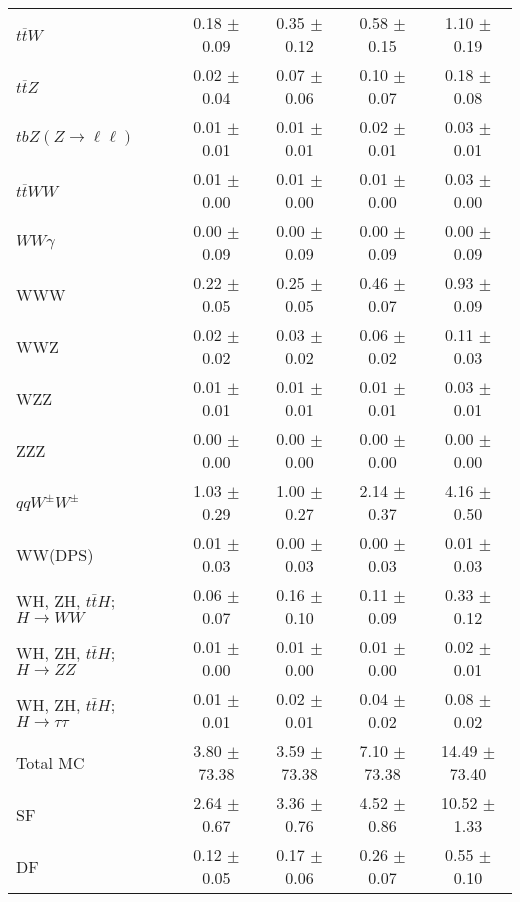 \begin{tabular}{l|cccc}
                   $t\overline{t}W$ &  0.18 $\pm$  0.09 &  0.35 $\pm$  0.12 &  0.58 $\pm$  0.15 &  1.10 $\pm$  0.19 \\
                   $t\overline{t}Z$ &  0.02 $\pm$  0.04 &  0.07 $\pm$  0.06 &  0.10 $\pm$  0.07 &  0.18 $\pm$  0.08 \\
    $tbZ (Z \rightarrow \ell \ell)$ &  0.01 $\pm$  0.01 &  0.01 $\pm$  0.01 &  0.02 $\pm$  0.01 &  0.03 $\pm$  0.01 \\
                  $t\overline{t}WW$ &  0.01 $\pm$  0.00 &  0.01 $\pm$  0.00 &  0.01 $\pm$  0.00 &  0.03 $\pm$  0.00 \\
                         $WW\gamma$ &  0.00 $\pm$  0.09 &  0.00 $\pm$  0.09 &  0.00 $\pm$  0.09 &  0.00 $\pm$  0.09 \\
                                WWW &  0.22 $\pm$  0.05 &  0.25 $\pm$  0.05 &  0.46 $\pm$  0.07 &  0.93 $\pm$  0.09 \\
                                WWZ &  0.02 $\pm$  0.02 &  0.03 $\pm$  0.02 &  0.06 $\pm$  0.02 &  0.11 $\pm$  0.03 \\
                                WZZ &  0.01 $\pm$  0.01 &  0.01 $\pm$  0.01 &  0.01 $\pm$  0.01 &  0.03 $\pm$  0.01 \\
                                ZZZ &  0.00 $\pm$  0.00 &  0.00 $\pm$  0.00 &  0.00 $\pm$  0.00 &  0.00 $\pm$  0.00 \\
                 $qqW^{\pm}W^{\pm}$ &  1.03 $\pm$  0.29 &  1.00 $\pm$  0.27 &  2.14 $\pm$  0.37 &  4.16 $\pm$  0.50 \\
                            WW(DPS) &  0.01 $\pm$  0.03 &  0.00 $\pm$  0.03 &  0.00 $\pm$  0.03 &  0.01 $\pm$  0.03 \\
WH, ZH, $t\bar{t}H$; $H \rightarrow WW$ &  0.06 $\pm$  0.07 &  0.16 $\pm$  0.10 &  0.11 $\pm$  0.09 &  0.33 $\pm$  0.12 \\
WH, ZH, $t\bar{t}H$; $H \rightarrow ZZ$ &  0.01 $\pm$  0.00 &  0.01 $\pm$  0.00 &  0.01 $\pm$  0.00 &  0.02 $\pm$  0.01 \\
WH, ZH, $t\bar{t}H$; $H \rightarrow \tau\tau$ &  0.01 $\pm$  0.01 &  0.02 $\pm$  0.01 &  0.04 $\pm$  0.02 &  0.08 $\pm$  0.02 \\
\hline\hline
                           Total MC &  3.80 $\pm$ 73.38 &  3.59 $\pm$ 73.38 &  7.10 $\pm$ 73.38 & 14.49 $\pm$ 73.40 \\
\hline
                                 SF &  2.64 $\pm$  0.67 &  3.36 $\pm$  0.76 &  4.52 $\pm$  0.86 & 10.52 $\pm$  1.33 \\
                                 DF &  0.12 $\pm$  0.05 &  0.17 $\pm$  0.06 &  0.26 $\pm$  0.07 &  0.55 $\pm$  0.10 \\

\end{tabular}

